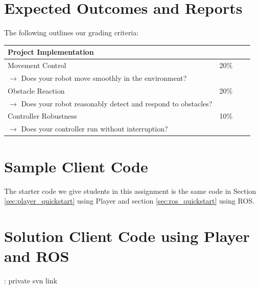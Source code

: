 \section{Expected Outcomes and Reports}

The following outlines our grading criteria:

\vspace{1cm}
\begin{tabular}{|l|l||l|l|}
\hline
{\large \bf Project Implementation} & \\
\hline
\hline
Movement Control & 20\% \\
$\rightarrow$ Does your robot move smoothly in the environment? & \\
\hline
Obstacle Reaction & 20\% \\
$\rightarrow$ Does your robot reasonably detect and respond to obstacles? & \\
\hline
Controller Robustness & 10\% \\
$\rightarrow$ Does your controller run without interruption? & \\
\hline
\end{tabular}

\section{Sample Client Code}

The starter code we give students in this assignment is the same code in Section \ref{sec:player_quickstart} using Player and section \ref{sec:ros_quickstart} using ROS.

\section{Solution Client Code using Player and ROS}: private svn link

\newpage

